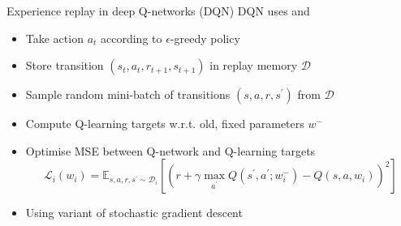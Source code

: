 \bgroup
\begin{frame}{Experience replay in deep Q-networks (DQN)}
DQN uses  and 
\begin{itemize}
\item Take action $a_t$ according to $\epsilon$-greedy policy
\item Store transition $(s_t, a_t, r_{t+1}, s_{t+1})$ in replay memory $\mathcal{D}$
\item Sample random mini-batch of transitions $(s, a, r, s^{\prime})$ from $\mathcal{D}$
\item Compute Q-learning targets w.r.t. old, fixed parameters $w^{-}$
\item Optimise MSE between Q-network and Q-learning targets
\begin{equation*}
\mathcal{L}_i(w_i)=\mathbb{E}_{s,a,r,s^{\prime}\sim\mathcal{D}_i}\left[\left(r + \gamma \max_{a^{\prime}}Q(s^{\prime}, a^{\prime};w_i^{-}) - Q(s, a, w_i)\right)^2\right]
\end{equation*}
\item Using variant of stochastic gradient descent
\end{itemize}
\end{frame}
\egroup